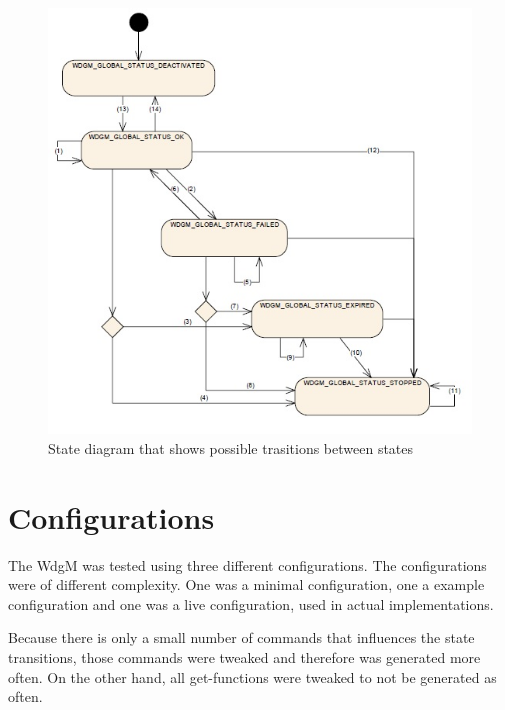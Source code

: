 \begin{figure}[h!]
  \begin{center}
    \includegraphics{pictures/globalstatuses.jpg}
  \end{center}
  \caption{State diagram that shows possible trasitions between states}
  \label{FIG:GLOBALSTATUSES}
\end{figure}

\section{Configurations}
The WdgM was tested using three different configurations. The configurations
were of different complexity. One was a minimal configuration, one a example
configuration and one was a live configuration, used in actual implementations.

Because there is only a small number of commands that influences the state
transitions, those commands were tweaked and therefore was generated more
often. On the other hand, all get-functions were tweaked to not be generated as often.

